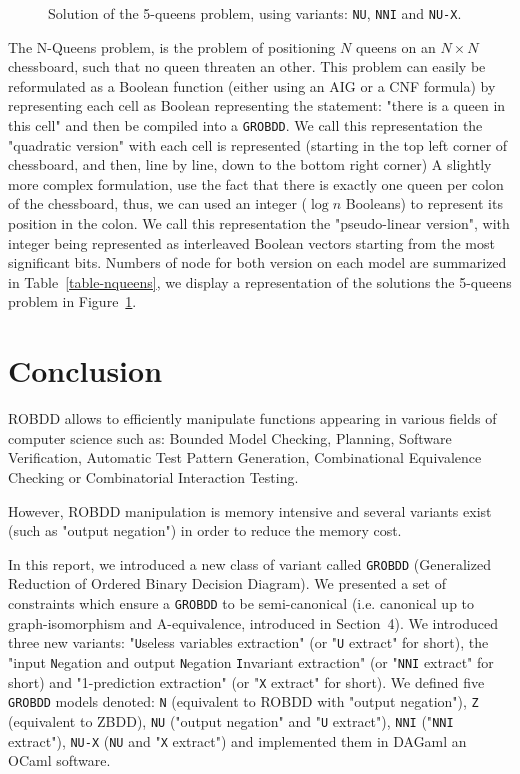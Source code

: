 \documentclass[a4paper,10pt]{article}
\newcommand{\includeframe}[4]{\makebox[#2\linewidth]{\texttt{[image: \#4]}}}
\newcommand{\Uextract}{"\texttt{U}seless variables extraction"}
\newcommand{\uextract}{"\texttt{U} extract"}
\newcommand{\NNIextract}{"input \texttt{N}egation and output \texttt{N}egation \texttt{I}nvariant extraction"}
\newcommand{\nniextract}{"\texttt{NNI} extract"}
\newcommand{\Xextract}{"1-prediction extraction"}
\newcommand{\xextract}{"\texttt{X} extract"}
\newcommand{\GroBdd}{\texttt{GROBDD}}
\begin{document}
\begin{figure}
\center
\includeframe{1}{0.9}{}{nqueens.pdf}
\caption{Solution of the 5-queens problem, using variants: \texttt{NU}, \texttt{NNI} and \texttt{NU-X}.}
\label{figure-nqueens}
\end{figure}

The N-Queens problem, is the problem of positioning $N$ queens on an $N\times N$ chessboard, such that no queen threaten an other.
This problem can easily be reformulated as a Boolean function (either using an AIG or a CNF formula) by representing each cell as Boolean representing the statement: "there is a queen in this cell" and then be compiled into a \GroBdd{}.
We call this representation the "quadratic version" with each cell is represented (starting in the top left corner of chessboard, and then, line by line, down to the bottom right corner)
A slightly more complex formulation, use the fact that there is exactly one queen per colon of the chessboard, thus, we can used an integer ($\log n$ Booleans) to represent its position in the colon.
We call this representation the "pseudo-linear version", with integer being represented as interleaved Boolean vectors starting from the most significant bits.
Numbers of node for both version on each model are summarized in Table~\ref{table-nqueens}, we display a representation of the solutions the 5-queens problem in Figure~\ref{figure-nqueens}.



\section{Conclusion}

ROBDD allows to efficiently manipulate functions appearing in various fields of computer science such as: Bounded Model Checking, Planning, Software Verification, Automatic Test Pattern Generation, Combinational Equivalence Checking or Combinatorial Interaction Testing.

However, ROBDD manipulation is memory intensive and several variants exist (such as "output negation") in order to reduce the memory cost.

In this report, we introduced a new class of variant called \GroBdd{} (Generalized Reduction of Ordered Binary Decision Diagram).
We presented a set of constraints which ensure a \GroBdd{} to be semi-canonical (i.e. canonical up to graph-isomorphism and A-equivalence, introduced in Section~4).
We introduced three new variants: \Uextract{} (or \uextract{} for short), the \NNIextract{} (or \nniextract{} for short) and \Xextract{} (or \xextract{} for short).
We defined five \GroBdd{} models denoted: \texttt{N} (equivalent to ROBDD with "output negation"), \texttt{Z} (equivalent to ZBDD), \texttt{NU} ("output negation" and \uextract{}), \texttt{NNI} (\nniextract{}), \texttt{NU-X} (\texttt{NU} and \xextract{}) and implemented them in DAGaml\cite{DAGamlGitHub} an OCaml software.
\end{document}
